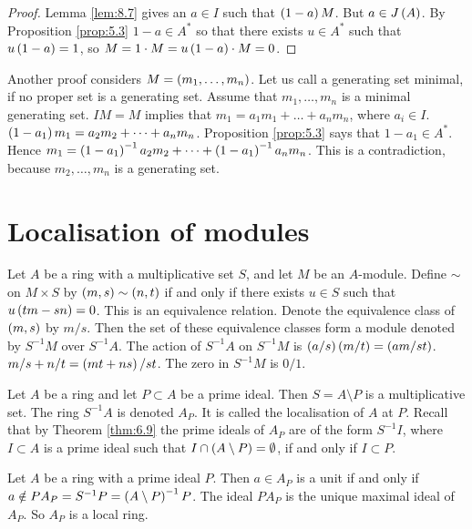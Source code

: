 \begin{proof}
Lemma \ref{lem:8.7} gives an $ a \in I $ such that $ \left( 1 - a \right)M $. But $ a \in J\left( A \right) $. By Proposition \ref{prop:5.3} $ 1 - a \in A^* $ so that there exists $ u \in A^* $ such that $ u\left( 1 - a \right) = 1 $, so $ M = 1 \cdot M  = u\left( 1 - a \right) \cdot M = 0 $.
\end{proof}

Another proof considers $ M = \left( m_1, \dots, m_n \right) $. Let us call a generating set minimal, if no proper set is a generating set. Assume that $ m_1, \dots, m_n $ is a minimal generating set. $ IM = M $ implies that $ m_1 = a_1m_1 + \dots + a_nm_n $, where $ a_i \in I $. $ \left( 1 - a_1 \right)m_1 = a_2m_2 + \dots + a_nm_n $. Proposition \ref{prop:5.3} says that $ 1 - a_1 \in A^* $. Hence $ m_1 = \left( 1 - a_1 \right)^{-1}a_2m_2 + \dots + \left( 1 - a_1 \right)^{-1}a_nm_n $. This is a contradiction, because $ m_2, \dots, m_n $ is a generating set.

\pagebreak

\section{Localisation of modules}

\begin{definition}
Let $ A $ be a ring with a multiplicative set $ S $, and let $ M $ be an $ A $-module. Define $ \sim $ on $ M \times S $ by $ \left( m, s \right) \sim \left( n, t \right) $ if and only if there exists $ u \in S $ such that $ u\left( tm - sn \right) = 0 $. This is an equivalence relation. Denote the equivalence class of $ \left( m, s \right) $ by $ m / s $. Then the set of these equivalence classes form a module denoted by $ S^{-1}M $ over $ S^{-1}A $. The action of $ S^{-1}A $ on $ S^{-1}M $ is $ \left( a / s \right)\left( m / t \right) = \left( am / st \right) $. $ m / s + n / t = \left( mt + ns \right) / st $. The zero in $ S^{-1}M $ is $ 0 / 1 $.
\end{definition}

\begin{definition}
Let $ A $ be a ring and let $ P \subset A $ be a prime ideal. Then $ S = A \setminus P $ is a multiplicative set. The ring $ S^{-1}A $ is denoted $ A_P $. It is called the localisation of $ A $ at $ P $. Recall that by Theorem \ref{thm:6.9} the prime ideals of $ A_P $ are of the form $ S^{-1}I $, where $ I \subset A $ is a prime ideal such that $ I \cap \left( A \setminus P \right) = \emptyset $, if and only if $ I \subset P $.
\end{definition}

\begin{theorem}
Let $ A $ be a ring with a prime ideal $ P $. Then $ a \in A_P $ is a unit if and only if $ a \notin PA_P = S^{-1}P = \left( A \setminus P \right)^{-1}P $. The ideal $ PA_P $ is the unique maximal ideal of $ A_P $. So $ A_P $ is a local ring.
\end{theorem}

